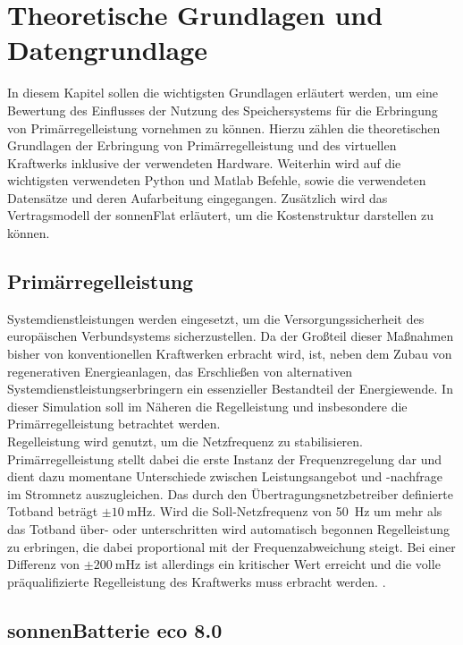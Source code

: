 
\section{Theoretische Grundlagen und Datengrundlage}

In diesem Kapitel sollen die wichtigsten Grundlagen erläutert werden, um eine Bewertung des Einflusses der Nutzung des Speichersystems für die Erbringung von Primärregelleistung vornehmen zu können. Hierzu zählen die theoretischen Grundlagen der Erbringung von Primärregelleistung und des virtuellen Kraftwerks inklusive der verwendeten Hardware. Weiterhin wird auf die wichtigsten verwendeten Python und Matlab Befehle, sowie die verwendeten Datensätze und deren Aufarbeitung eingegangen. Zusätzlich wird das Vertragsmodell der sonnenFlat erläutert, um die Kostenstruktur darstellen zu können.

\subsection{Primärregelleistung}

Systemdienstleistungen werden eingesetzt, um die Versorgungssicherheit des europäischen Verbundsystems sicherzustellen. Da der Großteil dieser Maßnahmen bisher von konventionellen Kraftwerken erbracht wird, ist, neben dem Zubau von regenerativen Energieanlagen, das Erschließen von alternativen Systemdienstleistungserbringern ein essenzieller Bestandteil der Energiewende. In dieser Simulation soll im Näheren die Regelleistung und insbesondere die Primärregelleistung betrachtet werden.\medskip\\
Regelleistung wird genutzt, um die Netzfrequenz zu stabilisieren. Primärregelleistung stellt dabei die erste Instanz der Frequenzregelung dar und dient dazu momentane Unterschiede zwischen Leistungsangebot und -nachfrage im Stromnetz auszugleichen. Das durch den Übertragungsnetzbetreiber definierte Totband beträgt $\pm \SI{10}{\milli\hertz}$. Wird die Soll-Netzfrequenz von \SI{50}{\hertz} um mehr als das Totband über- oder unterschritten wird automatisch begonnen Regelleistung zu erbringen, die dabei proportional mit der Frequenzabweichung steigt. Bei einer Differenz von $\pm \SI{200}{\milli\hertz}$ ist allerdings ein kritischer Wert erreicht und die volle präqualifizierte Regelleistung des Kraftwerks muss erbracht werden. \parencite{nextKW20}.


\subsection{sonnenBatterie eco 8.0}\label{sec:SB_eco8_Theorie}

